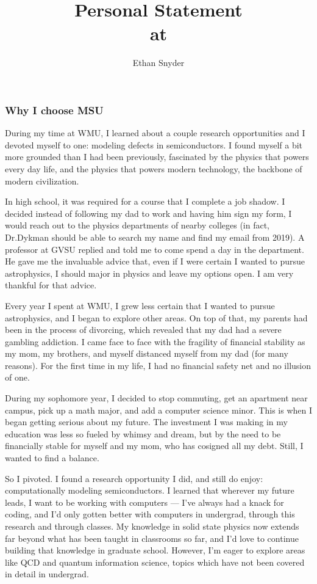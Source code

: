 \documentclass[11pt]{article}
\title{Personal Statement\\
	\large \dept{} at \school{}}
\author{Ethan Snyder}
\date{}
\newcommand{\schoolabbr}{MSU}
\begin{document}
\maketitle
\subsubsection*{Why I choose \schoolabbr}
During my time at WMU, I learned about a couple research opportunities and I devoted myself to one: modeling defects in semiconductors. I found myself a bit more grounded than I had been previously, fascinated by the physics that powers every day life, and the physics that powers modern technology, the backbone of modern civilization.

In high school, it was required for a course that I complete a job shadow. I decided instead of following my dad to work and having him sign my form, I would reach out to the physics departments of nearby colleges (in fact, Dr.\@ Dykman should be able to search my name and find my email from 2019). A professor at GVSU replied and told me to come spend a day in the department. He gave me the invaluable advice that, even if I were certain I wanted to pursue astrophysics, I should major in physics and leave my options open. I am very thankful for that advice.

Every year I spent at WMU, I grew less certain that I wanted to pursue astrophysics, and I began to explore other areas. On top of that, my parents had been in the process of divorcing, which revealed that my dad had a severe gambling addiction. I came face to face with the fragility of financial stability as my mom, my brothers, and myself distanced myself from my dad (for many reasons). For the first time in my life, I had no financial safety net and no illusion of one.

During my sophomore year, I decided to stop commuting, get an apartment near campus, pick up a math major, and add a computer science minor. This is when I began getting serious about my future. The investment I was making in my education was less so fueled by whimsy and dream, but by the need to be financially stable for myself and my mom, who has cosigned all my debt. Still, I wanted to find a balance.

So I pivoted. I found a research opportunity I did, and still do enjoy: computationally modeling semiconductors. I learned that wherever my future leads, I want to be working with computers --- I've always had a knack for coding, and I'd only gotten better with computers in undergrad, through this research and through classes. My knowledge in solid state physics now extends far beyond what has been taught in classrooms so far, and I'd love to continue building that knowledge in graduate school. However, I'm eager to explore areas like QCD and quantum information science, topics which have not been covered in detail in undergrad.
\end{document}
